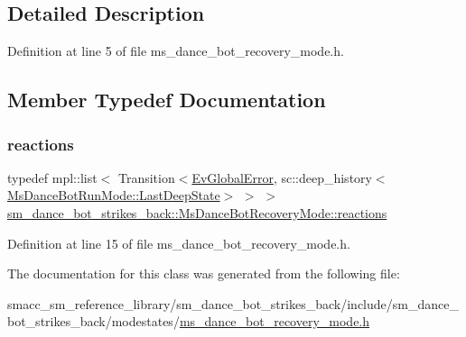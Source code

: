 \subsection{Detailed Description}


Definition at line 5 of file ms\+\_\+dance\+\_\+bot\+\_\+recovery\+\_\+mode.\+h.



\subsection{Member Typedef Documentation}
\mbox{\label{classsm__dance__bot__strikes__back_1_1MsDanceBotRecoveryMode_a65130a5e7f6d6179ea3651ee6c6d8b66}} 
\subsubsection{\texorpdfstring{reactions}{reactions}}
{\footnotesize\ttfamily typedef mpl\+::list$<$ Transition$<$\hyperlink{structsm__dance__bot__strikes__back_1_1EvGlobalError}{Ev\+Global\+Error}, sc\+::deep\+\_\+history$<$\hyperlink{classsmacc_1_1SmaccState_a60088405d2d99d468caa0baa3b2830a8}{Ms\+Dance\+Bot\+Run\+Mode\+::\+Last\+Deep\+State}$>$ $>$ $>$ \hyperlink{classsm__dance__bot__strikes__back_1_1MsDanceBotRecoveryMode_a65130a5e7f6d6179ea3651ee6c6d8b66}{sm\+\_\+dance\+\_\+bot\+\_\+strikes\+\_\+back\+::\+Ms\+Dance\+Bot\+Recovery\+Mode\+::reactions}}



Definition at line 15 of file ms\+\_\+dance\+\_\+bot\+\_\+recovery\+\_\+mode.\+h.



The documentation for this class was generated from the following file\+:\begin{DoxyCompactItemize}
\item 
smacc\+\_\+sm\+\_\+reference\+\_\+library/sm\+\_\+dance\+\_\+bot\+\_\+strikes\+\_\+back/include/sm\+\_\+dance\+\_\+bot\+\_\+strikes\+\_\+back/modestates/\hyperlink{sm__dance__bot__strikes__back_2include_2sm__dance__bot__strikes__back_2modestates_2ms__dance__bot__recovery__mode_8h}{ms\+\_\+dance\+\_\+bot\+\_\+recovery\+\_\+mode.\+h}\end{DoxyCompactItemize}
